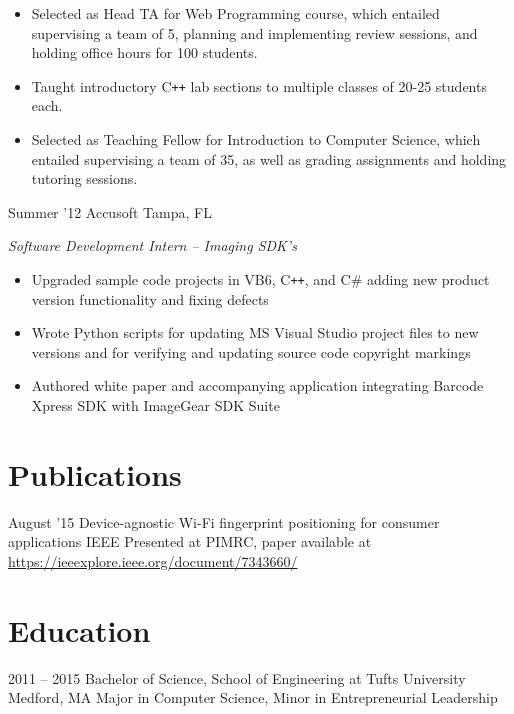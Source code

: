 \documentclass[print]{friggeri-cv} %
\begin{document}
\begin{entrylist}
{\begin{itemize}
\item Selected as Head TA for Web Programming course, which entailed supervising a team of 5, planning and implementing review sessions, and holding office hours for 100 students.
\item Taught introductory C{}\texttt{++} lab sections to multiple classes of 20-25 students each.
\item Selected as Teaching Fellow for Introduction to Computer Science, which entailed supervising a team of 35, as well as grading assignments and holding tutoring sessions.
\end{itemize} }
\entry
{Summer '12}
{Accusoft }
{Tampa, FL}
{\emph{Software Development Intern -- Imaging SDK's}
\begin{itemize}
\item Upgraded sample code projects in VB6, C{}\texttt{++}, and C\# adding new product version functionality and fixing defects
\item Wrote Python scripts for updating MS Visual Studio project files to new versions and for verifying and updating source code copyright markings
\item Authored white paper and accompanying application integrating Barcode Xpress SDK with ImageGear SDK Suite
\end{itemize}}
\end{entrylist}


\section{Publications}
\begin{entrylist}
\entry
{August '15}
{Device-agnostic Wi-Fi fingerprint positioning for consumer applications}
{IEEE}
{Presented at PIMRC, paper available at \href{https://ieeexplore.ieee.org/document/7343660/}{https://ieeexplore.ieee.org/document/7343660/}}
\end{entrylist}



\section{Education}
\begin{entrylist}
\entry
{2011 -- 2015}
{Bachelor of Science, School of Engineering at Tufts University}
{Medford, MA}
{Major in Computer Science, Minor in Entrepreneurial Leadership}


\end{entrylist}
\end{document}
